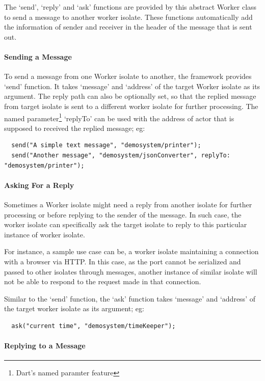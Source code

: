   The ‘send’, ‘reply’ and ‘ask’ functions are provided by this abstract Worker class to send a message to another worker isolate. These functions automatically add the information of sender and receiver in the header of the message that is sent out.

  \paragraph{Sending a Message}
  \label{para:sendMessage}
  To send a message from one Worker isolate to another, the framework provides ‘send’ function. It takes ‘message’ and ‘address’ of the target Worker isolate as its argument. The reply path can also be optionally set, so that the replied message from target isolate is sent to a different worker isolate for further processing. The named parameter\footnote{Dart's named paramter feature} ‘replyTo’ can be used with the address of actor that is supposed to received the replied message; eg:
\begin{lstlisting}
  send("A simple text message", "demosystem/printer");
  send("Another message", "demosystem/jsonConverter", replyTo: "demosystem/printer");
\end{lstlisting}

  \paragraph{Asking For a Reply}
  \label{subsec:askMessage}
  Sometimes a Worker isolate might need a reply from another isolate for further processing or before replying to the sender of the message. In such case, the worker isolate can specifically ask the target isolate to reply to this particular instance of worker isolate.

  For instance, a sample use case can be, a worker isolate maintaining a connection with a browser via HTTP. In this case, as the port cannot be serialized and passed to other isolates through messages, another instance of similar isolate will not be able to respond to the request made in that connection.

  Similar to the ‘send’ function, the ‘ask’ function takes ‘message’ and ‘address’ of the target worker isolate as its argument; eg:
\begin{lstlisting}
  ask("current time", "demosystem/timeKeeper");
\end{lstlisting}
  \paragraph{Replying to a Message}
  \label{subsec:replyMessage}

